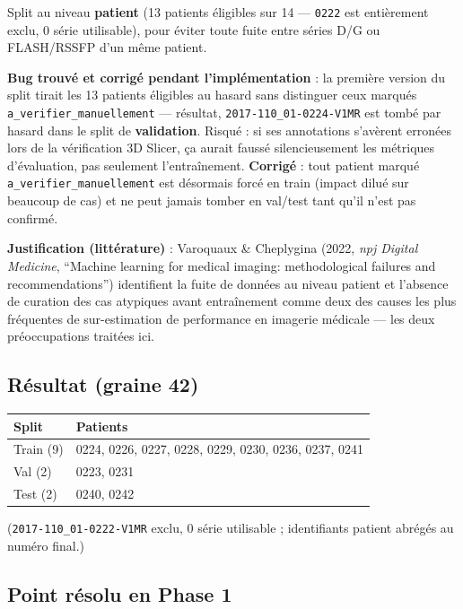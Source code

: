 Split au niveau \textbf{patient} (13 patients éligibles sur 14 --- \texttt{0222} est
entièrement exclu, 0 série utilisable), pour éviter toute fuite entre séries D/G ou
FLASH/RSSFP d'un même patient.

\textbf{Bug trouvé et corrigé pendant l'implémentation} : la première version du split
tirait les 13 patients éligibles au hasard sans distinguer ceux marqués
\texttt{a\_verifier\_manuellement} --- résultat, \texttt{2017-110\_01-0224-V1MR} est
tombé par hasard dans le split de \textbf{validation}. Risqué : si ses annotations
s'avèrent erronées lors de la vérification 3D Slicer, ça aurait faussé silencieusement
les métriques d'évaluation, pas seulement l'entraînement. \textbf{Corrigé} : tout
patient marqué \texttt{a\_verifier\_manuellement} est désormais forcé en train (impact
dilué sur beaucoup de cas) et ne peut jamais tomber en val/test tant qu'il n'est pas
confirmé.

\textbf{Justification (littérature)} : Varoquaux \& Cheplygina (2022, \emph{npj Digital
Medicine}, ``Machine learning for medical imaging: methodological failures and
recommendations'') identifient la fuite de données au niveau patient et l'absence de
curation des cas atypiques avant entraînement comme deux des causes les plus
fréquentes de sur-estimation de performance en imagerie médicale --- les deux
préoccupations traitées ici.

\subsection{Résultat (graine 42)}

\begin{center}
\begin{tabular}{ll}
\toprule
Split & Patients \\
\midrule
Train (9) & 0224, 0226, 0227, 0228, 0229, 0230, 0236, 0237, 0241 \\
Val (2)   & 0223, 0231 \\
Test (2)  & 0240, 0242 \\
\bottomrule
\end{tabular}
\end{center}

(\texttt{2017-110\_01-0222-V1MR} exclu, 0 série utilisable ; identifiants patient
abrégés au numéro final.)

\subsection{Point résolu en Phase 1}

